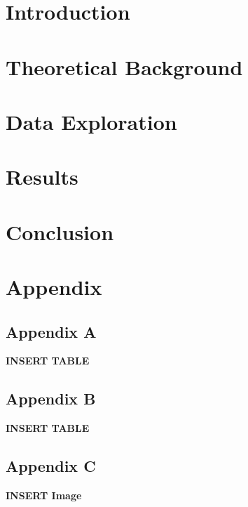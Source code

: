 \documentclass[a4paper, 12pt, oneside]{book}
\begin{document}
%

\chapter{Introduction}

\chapter{Theoretical Background}
 

\chapter{Data Exploration}


\chapter{Results}

\chapter{Conclusion}



\chapter*{Appendix}

\section*{Appendix A}
\label{appendix:spectrumTable1}
\textbf{INSERT TABLE}

\section*{Appendix B}
\label{appendix:spectrumTable2}
\textbf{INSERT TABLE}

\section*{Appendix C}
\label{appendix:hierimg0}
\textbf{INSERT Image}
\end{document}
